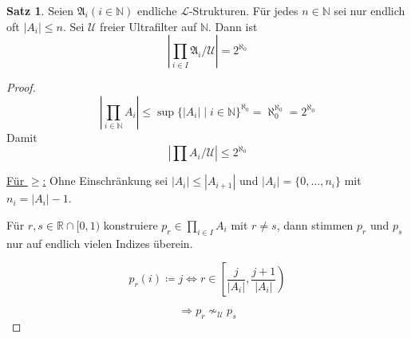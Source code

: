 \documentclass[12pt,parskip=full]{scrartcl}
\newcommand{\setN}{\mathbb{N}}
\newcommand{\setR}{\mathbb{R}}
\newcommand{\abs}[1]{{\left| #1 \right|}}
\newcommand{\heading}{\underline}
\theoremstyle{definition}
\newtheorem{theorem}{Satz}[section]
\begin{document}
	\begin{theorem}
		Seien $\mathfrak{A}_i (i \in \setN)$ endliche $\mathcal{L}$-Strukturen. Für jedes $n \in \setN$ sei nur endlich oft $\abs{A_i} \leq n$. Sei $\mathcal{U}$ freier Ultrafilter auf $\setN$. Dann ist
		\begin{equation*}
			\abs{\prod_{i \in I} \mathfrak{A}_i / \mathcal{U}} = 2^{\aleph_0}
		\end{equation*}
	\end{theorem}

	\begin{proof}
		\begin{equation*}
			\abs{\prod_{i \in \setN} A_i} \leq \sup \{ \abs{A_i} \mid i \in \setN \}^{\aleph_0} = \aleph_0^{\aleph_0} = 2^{\aleph_0}
		\end{equation*}
		Damit
		\begin{equation*}
			\abs{\prod A_i / \mathcal{U}} \leq 2^{\aleph_0}
		\end{equation*}
		
		\heading{Für $\geq$:} Ohne Einschränkung sei $\abs{A_i} \leq \abs{A_{i+1}}$ und $\abs{A_i} = \{ 0, \dots, n_i \}$ mit $n_i = \abs{A_i} - 1$.
		
		Für $r,s \in \setR \cap [0,1)$ konstruiere $p_r \in \prod_{i \in I} A_i$ mit $r \neq s$, dann stimmen $p_r$ und $p_s$ nur auf endlich vielen Indizes überein.
		
		\begin{equation*}
			p_r(i) \coloneqq j \Leftrightarrow r \in \left[ \frac{j}{\abs{A_i}}, \frac{j+1}{\abs{A_i}} \right)
		\end{equation*}
		
		\begin{equation*}
			\Rightarrow p_r \nsim_\mathcal{U} p_s
		\end{equation*}
	\end{proof}
\end{document}
